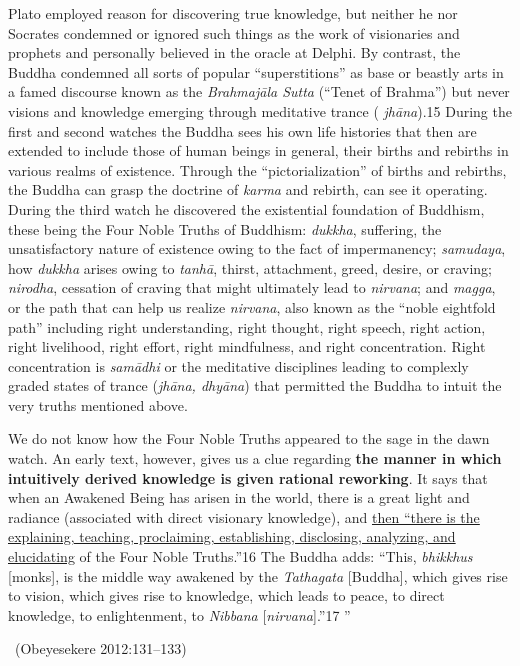 \begin{myquote}
Plato employed reason for discovering true knowledge, but neither he nor Socrates condemned or ignored such things as the work of visionaries and prophets and personally believed in the oracle at Delphi. By contrast, the Buddha condemned all sorts of popular “superstitions” as base or beastly arts in a famed discourse known as the \textit{Brahmajāla Sutta} (“Tenet of Brahma”) but never visions and knowledge emerging through meditative trance ( \textit{jhāna}).15 During the first and second watches the Buddha sees his own life histories that then are extended to include those of human beings in general, their births and rebirths in various realms of existence. Through the “pictorialization” of births and rebirths, the Buddha can grasp the doctrine of \textit{karma} and rebirth, can see it operating. During the third watch he discovered the existential foundation of Buddhism, these being the Four Noble Truths of Buddhism: \textit{dukkha}, suﬀering, the unsatisfactory nature of existence owing to the fact of impermanency; \textit{samudaya}, how \textit{dukkha} arises owing to \textit{tanhā}, thirst, attachment, greed, desire, or craving; \textit{nirodha}, cessation of craving that might ultimately lead to \textit{nirvana}; and \textit{magga}, or the path that can help us realize \textit{nirvana}, also known as the “noble eightfold path” including right understanding, right thought, right speech, right action, right livelihood, right eﬀort, right mindfulness, and right concentration. Right concentration is \textit{samādhi} or the meditative disciplines leading to complexly graded states of trance (\textit{jhāna, dhyāna}) that permitted the Buddha to intuit the very truths mentioned above.
\end{myquote}

\begin{myquote}
We do not know how the Four Noble Truths appeared to the sage in the dawn watch. An early text, however, gives us a clue regarding \textbf{the manner in which intuitively derived knowledge is given rational reworking}. It says that when an Awakened Being has arisen in the world, there is a great light and\\ radiance (associated with direct visionary knowledge), and \underline{then “there is the explaining, teaching, proclaiming, establishing, disclosing, analyzing, and elucidating} of the Four Noble Truths.”16 The Buddha adds: “This, \textit{bhikkhus} [monks], is the middle way awakened by the \textit{Tathagata} [Buddha], which gives rise to vision, which gives rise to knowledge, which leads to peace, to direct knowledge, to enlightenment, to \textit{Nibbana} [\textit{nirvana}].”17 ” 

~\hfill (Obeyesekere 2012:131–133)
\end{myquote}


